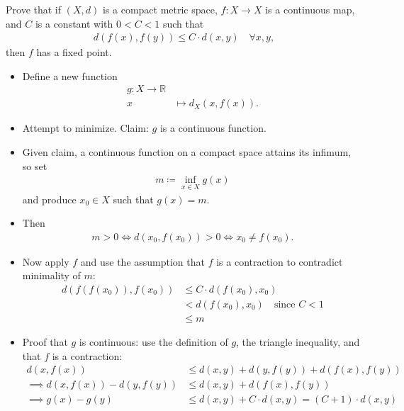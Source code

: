 \begin{problem}[?]

Prove that if \((X, d)\) is a compact metric space, \(f : X \to X\) is a
continuous map, and \(C\) is a constant with \(0 < C < 1\) such that
\begin{align*}
d(f (x), f (y)) \leq C \cdot d(x, y) \quad \forall x, y
,\end{align*}
then \(f\) has a fixed point.

\end{problem}

\begin{solution}

\envlist

\begin{concept}

\envlist

\end{concept}

\begin{itemize}
\item
  Define a new function
  \begin{align*}     g: X \to {\mathbb{R}}\\     x &\mapsto d_X(x, f(x))     .\end{align*}
\item
  Attempt to minimize. Claim: \(g\) is a continuous function.
\item
  Given claim, a continuous function on a compact space attains its
  infimum, so set
  \begin{align*}       m \coloneqq\inf_{x\in X} g(x)        \end{align*}
  and produce \(x_0\in X\) such that \(g(x) = m\).
\item
  Then
  \begin{align*}     m> 0 \iff d(x_0, f(x_0)) > 0 \iff x_0 \neq f(x_0)     .\end{align*}
\item
  Now apply \(f\) and use the assumption that \(f\) is a contraction to
  contradict minimality of \(m\):
  \begin{align*}     d(f(f(x_0)), f(x_0))      &\leq C\cdot d(f(x_0), x_0) \\      &< d(f(x_0), x_0) \quad\text{since } C<1\\     &\leq m     \end{align*}
\item
  Proof that \(g\) is continuous: use the definition of \(g\), the
  triangle inequality, and that \(f\) is a contraction:
  \begin{align*}     d(x, f(x)) &\leq d(x, y) + d(y, f(y)) + d(f(x), f(y)) \\     \implies d(x, f(x)) - d(y, f(y)) &\leq d(x, y) + d(f(x), f(y)) \\     \implies g(x) - g(y) &\leq d(x, y) + C\cdot d(x, y)  = (C+1) \cdot d(x, y)\\     \end{align*}


\end{itemize}
\end{solution}
